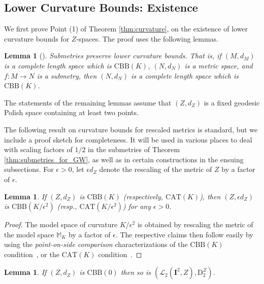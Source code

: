 \documentclass{article}
\newtheorem{lemma}[proposition]{Lemma}
\theoremstyle{definition}
\newcommand{\Lpp}[1]{\mathcal{L}_{#1}}
\newcommand{\dz}[1]{\mathrm{D}^Z_{#1}}
\begin{document}
 

\subsection{Lower Curvature Bounds: Existence}\label{sec:lower_curvature}

We first prove Point (1) of Theorem \ref{thm:curvature}, on the existence of lower curvature bounds for $Z$-spaces. The proof uses the following lemmas.

\begin{lemma}[{\cite[Corollary 8.34]{alexander2024alexandrov}}]\label{lem:submetries_preserve_curvature_bounds}
    Submetries preserve lower curvature bounds. That is, if $(M,d_M)$ is a complete length space which is $\mathrm{CBB}(K)$, $(N,d_N)$ is a metric space, and $f:M \to N$ is a submetry, then $(N,d_N)$ is a complete length space which is $\mathrm{CBB}(K)$.
\end{lemma}

The statements of the remaining lemmas assume that $(Z,d_Z)$ is a fixed geodesic Polish space containing at least two points.

The following result on curvature bounds for rescaled metrics is standard, but we include a proof sketch for completeness. It will be used in various places to deal with scaling factors of $1/2$ in the submetries of Theorem \ref{thm:submetries_for_GW}, as well as in certain constructions in the ensuing subsections. For $\epsilon > 0$, let $\epsilon d_Z$ denote the rescaling of the metric of $Z$ by a factor of $\epsilon$. 

\begin{lemma}\label{lem:scaling}
    If $(Z,d_Z)$ is $\mathrm{CBB}(K)$ (respectively, $\mathrm{CAT}(K)$), then $(Z,\epsilon d_Z)$ is $\mathrm{CBB}(K/\epsilon^2)$ (resp., $\mathrm{CAT}(K/\epsilon^2)$) for any $\epsilon > 0$.
\end{lemma}

\begin{proof}
    The model space of curvature $K/\epsilon^2$ is obtained by rescaling the metric of the model space $\mathbb{M}_K$ by a factor of $\epsilon$. The respective claims then follow easily by using the \emph{point-on-side comparison} characterizations of the $\mathrm{CBB}(K)$ condition~\cite[Theorem 8.14(b)]{alexander2024alexandrov}, or the $\mathrm{CAT}(K)$ condition~\cite[Theorem 9.14(b)]{alexander2024alexandrov}.
\end{proof}

\begin{lemma}\label{lem:L2_CBB}
    If $(Z,d_Z)$ is $\mathrm{CBB}(0)$ then so is $(\Lpp{2}(\mathbf{I}^2,Z),\dz{2})$. 
\end{lemma}
\end{document}
